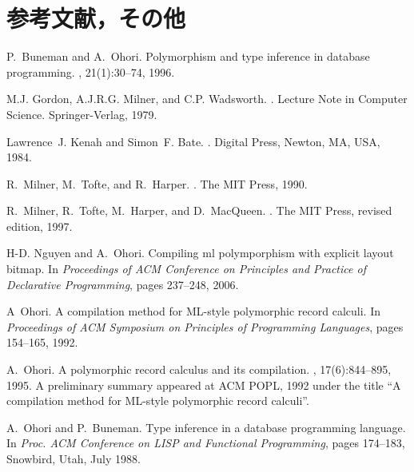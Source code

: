 \documentclass{jbook}
\newcommand{\txt}[2]{#1}
\begin{document}
\part{\txt{参考文献，その他}{Bibliography and other documents}}
\label{part:bib}
% 
% 
\begin{thebibliography}{10}

P.~Buneman and A.~Ohori.
\newblock Polymorphism and type inference in database programming.
, 21(1):30--74, 1996.

M.J. Gordon, A.J.R.G. Milner, and C.P. Wadsworth.
.
\newblock Lecture Note in Computer Science. Springer-Verlag, 1979.

Lawrence~J. Kenah and Simon~F. Bate.
.
\newblock Digital Press, Newton, MA, USA, 1984.

R.~Milner, M.~Tofte, and R.~Harper.
.
\newblock The MIT Press, 1990.

R.~Milner, R.~Tofte, M.~Harper, and D.~MacQueen.
.
\newblock The MIT Press, revised edition, 1997.

H-D. Nguyen and A.~Ohori.
\newblock Compiling ml polymporphism with explicit layout bitmap.
\newblock In {\em Proceedings of ACM Conference on Principles and Practice of
  Declarative Programming}, pages 237--248, 2006.

A~Ohori.
\newblock A compilation method for {ML}-style polymorphic record calculi.
\newblock In {\em Proceedings of ACM Symposium on Principles of Programming
  Languages}, pages 154--165, 1992.

A.~Ohori.
\newblock A polymorphic record calculus and its compilation.
,
  17(6):844--895, 1995.
\newblock A preliminary summary appeared at ACM POPL, 1992 under the title ``A
  compilation method for ML-style polymorphic record calculi''.

A.~Ohori and P.~Buneman.
\newblock Type inference in a database programming language.
\newblock In {\em Proc. ACM Conference on LISP and Functional Programming},
  pages 174--183, Snowbird, Utah, July 1988.


\end{thebibliography}
\end{document}
